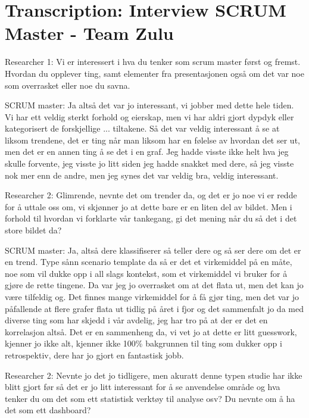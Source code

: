 \chapter{Transcription: Interview SCRUM Master - Team Zulu}
Researcher 1: Vi er interessert i hva du tenker som scrum master først og fremst. Hvordan du opplever ting, samt elementer fra presentasjonen også om det var noe som overrasket eller noe du savna.

SCRUM master: Ja altså det var jo interessant, vi jobber med dette hele tiden. Vi har ett veldig sterkt forhold og eierskap, men vi har aldri gjort dypdyk eller kategorisert de forskjellige ... tiltakene. Så det var veldig interessant å se  at liksom trendene, det er ting når man liksom har en følelse av hvordan det ser ut, men det er en annen ting å se det i en graf. Jeg hadde visste ikke helt hva jeg skulle forvente, jeg visste jo litt siden jeg hadde snakket med dere, så jeg visste nok mer enn de andre, men jeg synes det var veldig bra, veldig interessant.

Researcher 2: Glimrende, nevnte det om trender da, og det er jo noe vi er redde for å uttale oss om, vi skjønner jo at dette bare er en liten del av bildet. Men i forhold til hvordan vi forklarte vår tankegang, gi det mening når du så det i det store bildet da?

SCRUM master: Ja, altså dere klassifiserer så teller dere og så ser dere om det er en trend. Type sånn scenario template da så er det et virkemiddel på en måte, noe som vil dukke opp i all slags kontekst, som et virkemiddel vi bruker for å gjøre de rette tingene. Da var jeg jo overrasket om at det flata ut, men det kan jo være tilfeldig og. Det finnes mange virkemiddel for å få gjør ting, men det var jo påfallende at flere grafer flata ut tidlig på året i fjor og det sammenfalt jo da med diverse ting som har skjedd i vår avdelig, jeg har tro på at der er det en korrelasjon altså. Det er en sammenheng da, vi vet jo at dette er litt guesswork, kjenner jo ikke alt, kjenner ikke 100\% bakgrunnen til ting som dukker opp i retrospektiv, dere har jo gjort en fantastisk jobb.

Researcher 2: Nevnte jo det jo tidligere, men akuratt denne typen studie har ikke blitt gjort før så det er jo litt interessant for å se anvendelse område og hva tenker du om det som ett statistisk verktøy til analyse osv? Du nevnte om å ha det som ett dashboard?

